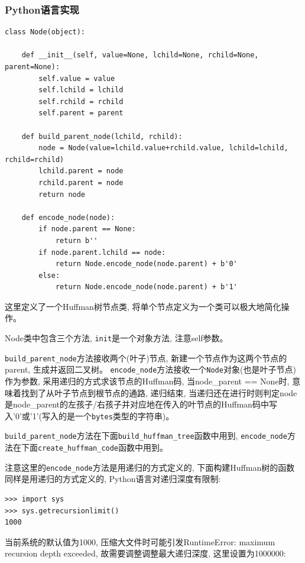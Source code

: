 \documentclass{ctexart}
\begin{document}
\subsubsection{Python语言实现}\label{header-n290}

{\setmainfont{Courier New Bold}              
\begin{lstlisting}
class Node(object):

    def __init__(self, value=None, lchild=None, rchild=None, parent=None):
        self.value = value
        self.lchild = lchild
        self.rchild = rchild
        self.parent = parent

    def build_parent_node(lchild, rchild):
        node = Node(value=lchild.value+rchild.value, lchild=lchild, rchild=rchild)
        lchild.parent = node
        rchild.parent = node
        return node

    def encode_node(node):
        if node.parent == None:
            return b''
        if node.parent.lchild == node:
            return Node.encode_node(node.parent) + b'0'
        else:
            return Node.encode_node(node.parent) + b'1'
\end{lstlisting}}

这里定义了一个Huffman树节点类, 将单个节点定义为一个类可以极大地简化操作。

Node类中包含三个方法, \texttt{init}是一个对象方法, 注意self参数。

\texttt{build\_parent\_node}方法接收两个(叶子)节点, 新建一个节点作为这两个节点的parent, 生成并返回二叉树。
\texttt{encode\_node}方法接收一个\texttt{Node}对象(也是叶子节点)作为参数, 采用递归的方式求该节点的Huffman码, 当node\_parent == None时, 意味着找到了从叶子节点到根节点的通路, 递归结束, 当递归还在进行时则判定node是node\_parent的左孩子/右孩子并对应地在传入的叶节点的Huffman码中写入'0'或'1'(写入的是一个\texttt{bytes}类型的字符串)。

\texttt{build\_parent\_node}方法在下面\texttt{build\_huffman\_tree}函数中用到, \texttt{encode\_node}方法在下面\texttt{create\_huffman\_code}函数中用到。

注意这里的\texttt{encode\_node}方法是用递归的方式定义的, 下面构建Huffman树的函数同样是用递归的方式定义的, Python语言对递归深度有限制:

{\setmainfont{Courier New Bold}              
\begin{lstlisting}
>>> import sys
>>> sys.getrecursionlimit()
1000
\end{lstlisting}}

当前系统的默认值为1000, 压缩大文件时可能引发RuntimeError: maximum recursion depth exceeded, 故需要调整调整最大递归深度, 这里设置为1000000:
\end{document}
